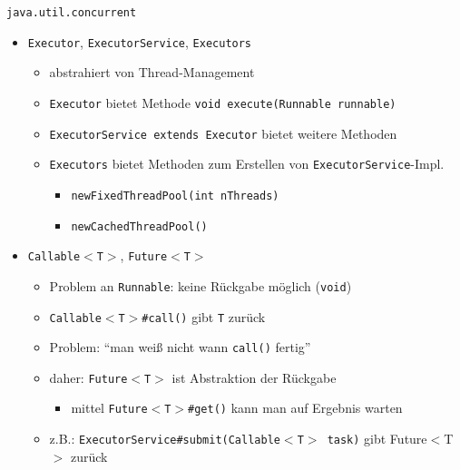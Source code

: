 \documentclass[18pt]{beamer}
\begin{document}
	\begin{frame}{\texttt{java.util.concurrent}}
		\begin{itemize}
			\item \texttt{Executor}, \texttt{ExecutorService}, \texttt{Executors}
			\begin{itemize}
				\item abstrahiert von Thread-Management
				\item \texttt{Executor} bietet Methode \texttt{void execute(Runnable runnable)} \pause
				\item \texttt{ExecutorService extends Executor} bietet weitere Methoden \pause
				\item \texttt{Executors} bietet Methoden zum Erstellen von \texttt{ExecutorService}-Impl.
				\begin{itemize}
					\item \texttt{newFixedThreadPool(int nThreads)}
					\item \texttt{newCachedThreadPool()}
				\end{itemize}
			\end{itemize} \pause
			\item \texttt{Callable$<$T$>$}, \texttt{Future$<$T$>$}
			\begin{itemize}
				\item Problem an \texttt{Runnable}: keine Rückgabe möglich (\texttt{void}) \pause
				\item \texttt{Callable$<$T$>$\#call()} gibt \texttt{T} zurück \pause
				\item Problem: \enquote{man weiß nicht wann \texttt{call()} fertig}
				\item daher: \texttt{Future$<$T$>$} ist Abstraktion der Rückgabe
				\begin{itemize}
					\item mittel \texttt{Future$<$T$>$\#get()} kann man auf Ergebnis warten
				\end{itemize} \pause
				\item z.B.: \texttt{ExecutorService\#submit(Callable$<$T$>$ task)} gibt Future$<$T$>$ zurück
			\end{itemize}
		\end{itemize}
	\end{frame}
\end{document}
